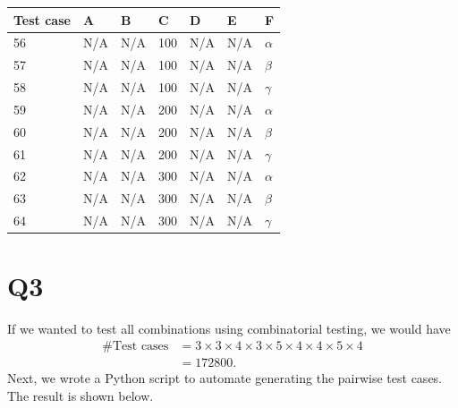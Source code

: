 \documentclass[12pt, letterpaper, titlepage]{article}
\begin{document}
\begin{centering}
\begin{tabularx}{\textwidth}{|X|X|X|X|X|X|X|}
    \caption{Test cases for output Z} \\ \hline
    \textbf{Test case} & \textbf{A} & \textbf{B} & \textbf{C} & \textbf{D} & \textbf{E} & \textbf{F} \\ \hline
    56 & N/A & N/A & 100 & N/A & N/A & $\alpha$ \\ \hline
    57 & N/A & N/A & 100 & N/A & N/A & $\beta$ \\ \hline
    58 & N/A & N/A & 100 & N/A & N/A & $\gamma$ \\ \hline
    59 & N/A & N/A & 200 & N/A & N/A & $\alpha$ \\ \hline
    60 & N/A & N/A & 200 & N/A & N/A & $\beta$ \\ \hline
    61 & N/A & N/A & 200 & N/A & N/A & $\gamma$ \\ \hline
    62 & N/A & N/A & 300 & N/A & N/A & $\alpha$ \\ \hline
    63 & N/A & N/A & 300 & N/A & N/A & $\beta$ \\ \hline
    64 & N/A & N/A & 300 & N/A & N/A & $\gamma$ \\ \hline
\end{tabularx}
\end{centering}

\section*{Q3}
If we wanted to test all combinations using combinatorial testing, we would have 
\begin{align}
    \text{\#Test cases} &= 3 \times 3 \times 4 \times 3 \times 5 \times 4 \times 4 \times 5 \times 4 \\
    &= 172800.
\end{align}
Next, we wrote a Python script to automate generating the pairwise test cases. The result is shown below.
\end{document}
